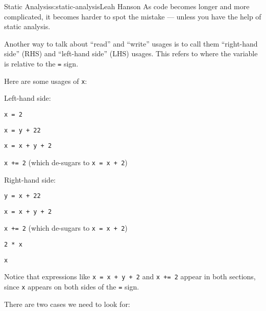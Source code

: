 \begin{aosachapter}{Static Analysis}{s:static-analysis}{Leah Hanson}
As code becomes longer and more complicated, it becomes harder to spot
the mistake --- unless you have the help of static analysis.

\label{left-hand-side-and-right-hand-side}

Another way to talk about ``read'' and ``write'' usages is to call them
``right-hand side'' (RHS) and ``left-hand side'' (LHS) usages. This
refers to where the variable is relative to the \texttt{=} sign.

Here are some usages of \texttt{x}:

\begin{aosaitemize}

\item
  Left-hand side:

  \begin{aosaitemize}
  
  \item
    \texttt{x = 2}
  \item
    \texttt{x = y + 22}
  \item
    \texttt{x = x + y + 2}
  \item
    \texttt{x += 2} (which de-sugars to \texttt{x = x + 2})
  \end{aosaitemize}
\item
  Right-hand side:

  \begin{aosaitemize}
  
  \item
    \texttt{y = x + 22}
  \item
    \texttt{x = x + y + 2}
  \item
    \texttt{x += 2} (which de-sugars to \texttt{x = x + 2})
  \item
    \texttt{2 * x}
  \item
    \texttt{x}
  \end{aosaitemize}
\end{aosaitemize}

Notice that expressions like \texttt{x = x + y + 2} and \texttt{x += 2}
appear in both sections, since \texttt{x} appears on both sides of the
\texttt{=} sign.

\label{looking-for-single-use-variables}

There are two cases we need to look for:

\begin{aosaenumerate}
\def\labelenumi{\arabic{enumi}.}


\end{aosaenumerate}
\end{aosachapter}

